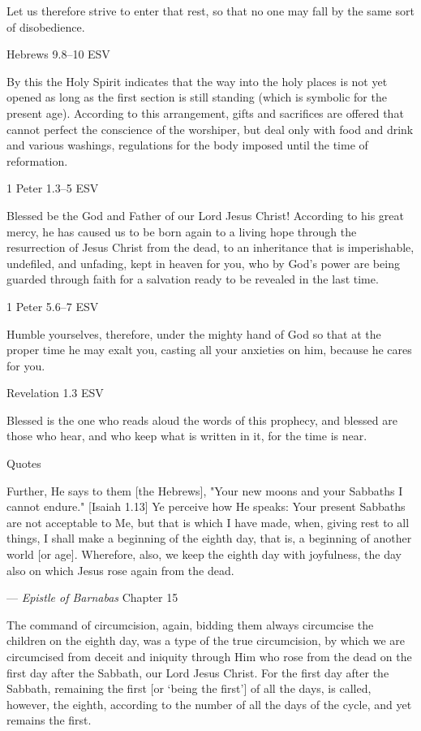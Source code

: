 \documentclass[
]{article}
\newcommand{\RL}[1]{\beginR #1\endR}
\begin{document}
Let us therefore strive to enter that rest, so that no one may fall by
the same sort of disobedience.

Hebrews 9.8--10 ESV

By this the Holy Spirit indicates that the way into the holy places is
not yet opened as long as the first section is still standing (which is
symbolic for the present age). According to this arrangement, gifts and
sacrifices are offered that cannot perfect the conscience of the
worshiper, but deal only with food and drink and various washings,
regulations for the body imposed until the time of reformation.

1 Peter 1.3--5 ESV

Blessed be the God and Father of our Lord Jesus Christ! According to his
great mercy, he has caused us to be born again to a living hope through
the resurrection of Jesus Christ from the dead, to an inheritance that
is imperishable, undefiled, and unfading, kept in heaven for you, who by
God\RL{'}s power are being guarded through faith for a salvation ready
to be revealed in the last time.

1 Peter 5.6--7 ESV

Humble yourselves, therefore, under the mighty hand of God so that at
the proper time he may exalt you, casting all your anxieties on him,
because he cares for you.

Revelation 1.3 ESV

Blessed is the one who reads aloud the words of this prophecy, and
blessed are those who hear, and who keep what is written in it, for the
time is near.

Quotes

Further, He says to them {[}the Hebrews{]}, "Your new moons and your
Sabbaths I cannot endure." {[}Isaiah 1.13{]} Ye perceive how He speaks:
Your present Sabbaths are not acceptable to Me, but that is which I have
made, when, giving rest to all things, I shall make a beginning of the
eighth day, that is, a beginning of another world {[}or age{]}.
Wherefore, also, we keep the eighth day with joyfulness, the day also on
which Jesus rose again from the dead.

--- \emph{Epistle of Barnabas} Chapter 15

The command of circumcision, again, bidding them always circumcise the
children on the eighth day, was a type of the true circumcision, by
which we are circumcised from deceit and iniquity through Him who rose
from the dead on the first day after the Sabbath, our Lord Jesus Christ.
For the first day after the Sabbath, remaining the first {[}or `being
the first'{]} of all the days, is called, however, the eighth, according
to the number of all the days of the cycle, and yet remains the first.
\end{document}
